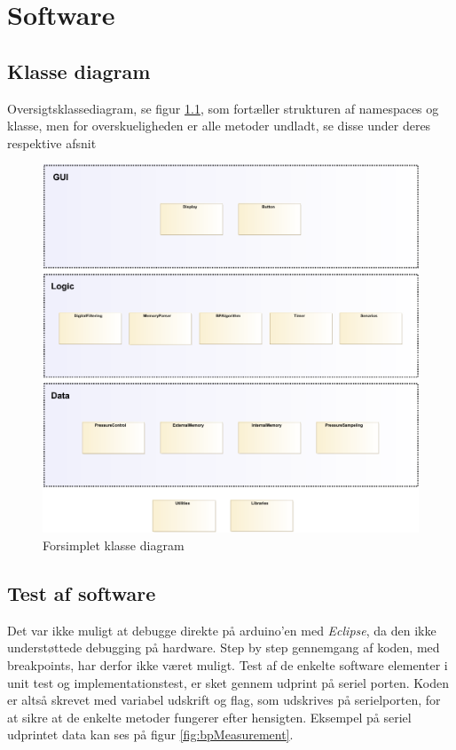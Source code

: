 \chapter{Software}

\section{Klasse diagram}
Oversigtsklassediagram, se figur \ref{fig:classDiagramSimple}, som fortæller strukturen af namespaces og klasse, men for overskueligheden er alle metoder undladt, se disse under deres respektive afsnit
\begin{figure}[H]
	\includegraphics[width=\textwidth]{Implementeringsdokument/klassediagram_forsimplet-crop.pdf}
	\caption{Forsimplet klasse diagram}\label{fig:classDiagramSimple}
\end{figure}
\newpage









\section{Test af software}
Det var ikke muligt at debugge direkte på arduino'en med \textit{Eclipse}, da den ikke understøttede debugging på hardware. Step by step gennemgang af koden, med breakpoints, har derfor ikke været muligt. Test af de enkelte software elementer i unit test og implementationstest, er sket gennem udprint på seriel porten. Koden er altså skrevet med variabel udskrift og flag, som udskrives på serielporten, for at sikre at de enkelte metoder fungerer efter hensigten. Eksempel på seriel udprintet data kan ses på figur \ref{fig:bpMeasurement}.